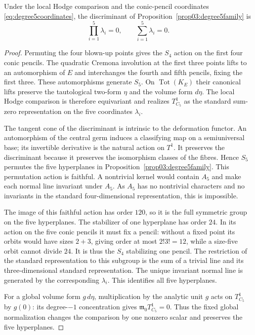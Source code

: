 \begin{lemma}\label{lem03:degree5marking}
Under the local Hodge comparison and the conic-pencil coordinates
\eqref{eq:degree5coordinates}, the discriminant of
Proposition~\ref{prop03:degree5family} is
\begin{equation}\label{eq03:degree5discriminant}
 \prod_{i=1}^5\lambda_i=0,
 \qquad \sum_{i=1}^5\lambda_i=0.
\end{equation}
\end{lemma}

\begin{proof}
Permuting the four blown-up points gives the $S_4$ action on the
first four conic pencils.  The quadratic Cremona involution at
the first three points lifts to an automorphism of $E$ and
interchanges the fourth and fifth pencils, fixing the first three.
These automorphisms generate $S_5$.  On
$\operatorname{Tot}(K_E)$ their canonical lifts preserve the
tautological two-form $\eta$ and the volume form $d\eta$.
The local Hodge comparison is therefore equivariant and realizes
$T^1_{C_5}$ as the standard sum-zero representation on the five
coordinates $\lambda_i$.

The tangent cone of the discriminant is intrinsic to the
deformation functor.  An automorphism of the central germ induces
a classifying map on a semiuniversal base; its invertible derivative
is the natural action on $T^1$.  It preserves the discriminant
because it preserves the isomorphism classes of the fibres.
Hence $S_5$ permutes the five hyperplanes in
Proposition~\ref{prop03:degree5family}.  This permutation action
is faithful.  A nontrivial kernel would contain $A_5$ and make
each normal line invariant under $A_5$.  As $A_5$ has no
nontrivial characters and no invariants in the standard
four-dimensional representation, this is impossible.

The image of this faithful action has order $120$, so it is the
full symmetric group on the five hyperplanes.  The stabilizer
of one hyperplane has order $24$.  In its action
on the five conic pencils it must fix a pencil: without a fixed
point its orbits would have sizes $2+3$, giving order at most
$2!3!=12$, while a size-five orbit cannot divide $24$.
It is thus the $S_4$ stabilizing one pencil.  The restriction
of the standard representation to this subgroup is the sum
of a trivial line and its three-dimensional standard representation.
The unique invariant normal line is generated by the corresponding
$\lambda_i$.  This identifies all five hyperplanes.

For a global volume form $g\,d\eta$, multiplication by the
analytic unit $g$ acts on $T^1_{C_5}$ by $g(0)$: its degree-$-1$
concentration gives $\mathfrak m_0T^1_{C_5}=0$.
Thus the fixed global normalization changes the comparison by
one nonzero scalar and preserves the five hyperplanes.
\end{proof}

